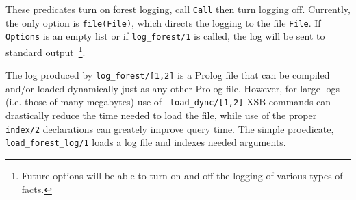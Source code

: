 \begin{description}
%
These predicates turn on forest logging, call {\tt Call} then turn
logging off.  Currently, the only option is {\tt file(File)}, which
directs the logging to the file {\tt File}.  If {\tt Options} is an
empty list or if {\tt log\_forest/1} is called, the log will be sent
to standard output~\footnote{Future options will be able to turn on
  and off the logging of various types of facts.}.

%
The log produced by {\tt log\_forest/[1,2]} is a Prolog file that can
be compiled and/or loaded dynamically just as any other Prolog file.
However, for large logs (i.e. those of many megabytes) use of {\tt
  load\_dync/[1,2]} XSB commands can drastically reduce the time
needed to load the file, while use of the proper {\tt index/2}
declarations can greately improve query time.  The simple proedicate,
{\tt load\_forest\_log/1} loads a log file and indexes needed arguments.
\end{description}





